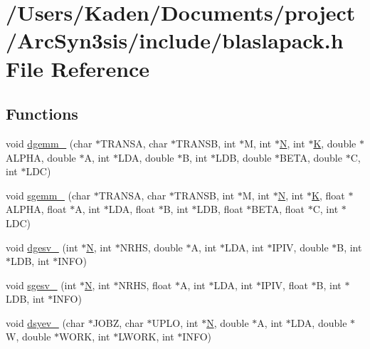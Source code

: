 \hypertarget{a00476}{}\section{/\+Users/\+Kaden/\+Documents/project/\+Arc\+Syn3sis/include/blaslapack.h File Reference}
\label{a00476}
\subsection*{Functions}
\begin{DoxyCompactItemize}
\item 
void \hyperlink{a00476_a9840ce0aeb2a881e52fb96b7967c71e3}{dgemm\+\_\+} (char $\ast$T\+R\+A\+N\+SA, char $\ast$T\+R\+A\+N\+SB, int $\ast$M, int $\ast$\hyperlink{a00473_a5b9c4563028063ee53b517cce9aa701b}{N}, int $\ast$\hyperlink{a00608_a16e4ef534cec559430e07e05eb71c719}{K}, double $\ast$A\+L\+P\+HA, double $\ast$A, int $\ast$L\+DA, double $\ast$B, int $\ast$L\+DB, double $\ast$B\+E\+TA, double $\ast$C, int $\ast$L\+DC)
\item 
void \hyperlink{a00476_aa675ecc26ad727070c2d31af7e0ff8b0}{sgemm\+\_\+} (char $\ast$T\+R\+A\+N\+SA, char $\ast$T\+R\+A\+N\+SB, int $\ast$M, int $\ast$\hyperlink{a00473_a5b9c4563028063ee53b517cce9aa701b}{N}, int $\ast$\hyperlink{a00608_a16e4ef534cec559430e07e05eb71c719}{K}, float $\ast$A\+L\+P\+HA, float $\ast$A, int $\ast$L\+DA, float $\ast$B, int $\ast$L\+DB, float $\ast$B\+E\+TA, float $\ast$C, int $\ast$L\+DC)
\item 
void \hyperlink{a00476_a286edb8a8718c68dd5b7e73570b82a95}{dgesv\+\_\+} (int $\ast$\hyperlink{a00473_a5b9c4563028063ee53b517cce9aa701b}{N}, int $\ast$N\+R\+HS, double $\ast$A, int $\ast$L\+DA, int $\ast$I\+P\+IV, double $\ast$B, int $\ast$L\+DB, int $\ast$I\+N\+FO)
\item 
void \hyperlink{a00476_a593a1c5071f01991707a6e4dacb8e3a7}{sgesv\+\_\+} (int $\ast$\hyperlink{a00473_a5b9c4563028063ee53b517cce9aa701b}{N}, int $\ast$N\+R\+HS, float $\ast$A, int $\ast$L\+DA, int $\ast$I\+P\+IV, float $\ast$B, int $\ast$L\+DB, int $\ast$I\+N\+FO)
\item 
void \hyperlink{a00476_a34948ab00349d4a3a6e4498bb7bb1540}{dsyev\+\_\+} (char $\ast$J\+O\+BZ, char $\ast$U\+P\+LO, int $\ast$\hyperlink{a00473_a5b9c4563028063ee53b517cce9aa701b}{N}, double $\ast$A, int $\ast$L\+DA, double $\ast$W, double $\ast$W\+O\+RK, int $\ast$L\+W\+O\+RK, int $\ast$I\+N\+FO)

\end{DoxyCompactItemize}
